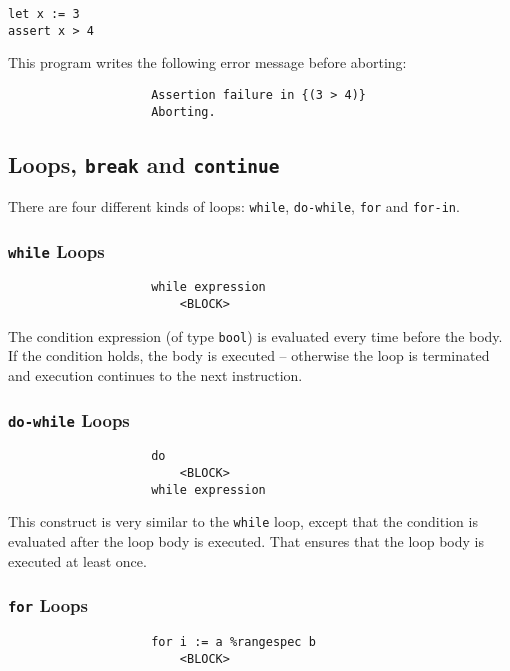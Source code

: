 \documentclass{article}
\newcommand{\code}[1]{\lstinline[columns=fixed]{#1}}
\begin{document}
				\begin{lstlisting}
let x := 3
assert x > 4
				\end{lstlisting}
				
				This program writes the following error message before aborting:
				
				\begin{verbatim}
					Assertion failure in {(3 > 4)}
					Aborting.
				\end{verbatim}
		
		\subsection{Loops, \code{break} and \code{continue}}
		
			There are four different kinds of loops: \code{while}, \code{do-while}, \code{for} and \code{for-in}.
			
			\subsubsection{\code{while} Loops}
			
				\begin{verbatim}
					while expression
					    <BLOCK>
				\end{verbatim}
				
				The condition expression (of type \code{bool}) is evaluated every time before the body. If the condition holds, the body is executed -- otherwise the loop is terminated and execution continues to the next instruction.
				
			\subsubsection{\code{do-while} Loops}
			
				\begin{verbatim}
					do
					    <BLOCK>
					while expression
				\end{verbatim}
				
				This construct is very similar to the \code{while} loop, except that the condition is evaluated after the loop body is executed. That ensures that the loop body is executed at least once.
				
			\subsubsection{\code{for} Loops}
			
				\begin{verbatim}
					for i := a %rangespec b
					    <BLOCK>
				\end{verbatim}
				
\end{document}
